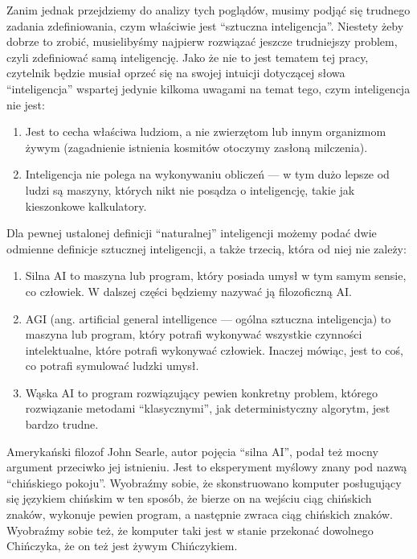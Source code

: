 \documentclass[10pt,a4paper]{article}
\begin{document}
	\par Zanim jednak przejdziemy do analizy tych poglądów, musimy podjąć się trudnego zadania zdefiniowania, czym właściwie jest ``sztuczna inteligencja''. Niestety żeby dobrze to zrobić, musielibyśmy najpierw rozwiązać jeszcze trudniejszy problem, czyli zdefiniować samą inteligencję. Jako że nie to jest tematem tej pracy, czytelnik będzie musiał oprzeć się na swojej intuicji dotyczącej słowa ``inteligencja'' wspartej jedynie kilkoma uwagami na temat tego, czym inteligencja nie jest:
	\begin{enumerate}
		\item Jest to cecha właściwa ludziom, a nie zwierzętom lub innym organizmom żywym (zagadnienie istnienia kosmitów otoczymy zasłoną milczenia).
		\item Inteligencja nie polega na wykonywaniu obliczeń — w tym dużo lepsze od ludzi są maszyny, których nikt nie posądza o inteligencję, takie jak kieszonkowe kalkulatory.
	\end{enumerate}
	\par Dla pewnej ustalonej definicji ``naturalnej'' inteligencji możemy podać dwie odmienne definicje sztucznej inteligencji, a także trzecią, która od niej nie zależy:
	\begin{enumerate}
		\item Silna AI to maszyna lub program, który posiada umysł w tym samym sensie, co człowiek. W dalszej części będziemy nazywać ją filozoficzną AI.
		\item AGI (ang. artificial general intelligence — ogólna sztuczna inteligencja) to maszyna lub program, który potrafi wykonywać wszystkie czynności intelektualne, które potrafi wykonywać człowiek. Inaczej mówiąc, jest to coś, co potrafi symulować ludzki umysł.
		\item Wąska AI to program rozwiązujący pewien konkretny problem, którego rozwiązanie metodami ``klasycznymi'', jak deterministyczny algorytm, jest bardzo trudne.
	\end{enumerate}
	\par Amerykański filozof John Searle, autor pojęcia ``silna AI'', podał też mocny argument przeciwko jej istnieniu. Jest to eksperyment myślowy znany pod nazwą ``chińskiego pokoju''. Wyobraźmy sobie, że skonstruowano komputer posługujący się językiem chińskim w ten sposób, że bierze on na wejściu ciąg chińskich znaków, wykonuje pewien program, a następnie zwraca ciąg chińskich znaków. Wyobraźmy sobie też, że komputer taki jest w stanie przekonać dowolnego Chińczyka, że on też jest żywym Chińczykiem.
\end{document}
